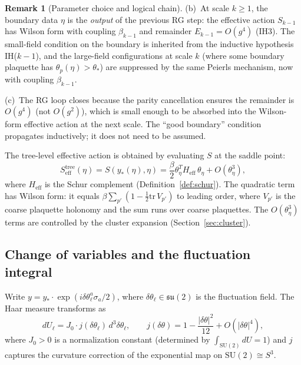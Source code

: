 \documentclass[11pt]{article}
\theoremstyle{definition}
\newtheorem{remark}[theorem]{Remark}
\newcommand{\SU}{\mathrm{SU}}
\newcommand{\su}{\mathfrak{su}}
\newcommand{\tr}{\mathrm{tr}}
\begin{document}
\begin{remark}[Parameter choice and logical chain]
(b)~At scale $k\ge 1$, the boundary data $\eta$ is the
\emph{output} of the previous RG step: the effective action
$S_{k-1}$ has Wilson form with coupling $\beta_{k-1}$
and remainder $E_{k-1}=O(g^4)$ (IH3).  The small-field
condition on the boundary is inherited from the inductive
hypothesis IH($k-1$), and the large-field configurations
at scale $k$ (where some boundary plaquette has
$\theta_p(\eta)>\theta_*$) are suppressed by the same
Peierls mechanism, now with coupling $\beta_{k-1}$.

(c)~The RG loop closes because the parity cancellation
ensures the remainder is $O(g^4)$ (not $O(g^2)$), which is
small enough to be absorbed into the Wilson-form effective
action at the next scale.  The ``good boundary'' condition
propagates inductively; it does not need to be assumed.
\end{remark}

The tree-level effective action is obtained by evaluating $S$ at the
saddle point:
\begin{equation}\label{eq:tree}
S_{\mathrm{eff}}^{\mathrm{tree}}(\eta)
=S(y_*(\eta),\eta)
=\frac{\beta}{2}\theta_\eta^T H_{\mathrm{eff}}\,\theta_\eta
+O(\theta_\eta^3),
\end{equation}
where $H_{\mathrm{eff}}$ is the Schur complement
(Definition~\ref{def:schur}).  The quadratic term has Wilson form:
it equals $\beta\sum_{p'}(1-\frac{1}{2}\tr\,V_{p'})$ to leading
order, where $V_{p'}$ is the coarse plaquette holonomy and the sum
runs over coarse plaquettes.  The $O(\theta_\eta^3)$ terms are
controlled by the cluster expansion (Section~\ref{sec:cluster}).

\subsection{Change of variables and the fluctuation integral}
\label{subsec:fluctuation}

Write $y=y_*\cdot\exp(i\delta\theta^a_\ell\sigma_a/2)$, where
$\delta\theta_\ell\in\su(2)$ is the fluctuation field.  The Haar
measure transforms as
\begin{equation}
dU_\ell=J_0\cdot j(\delta\theta_\ell)\,d^3\delta\theta_\ell,
\qquad j(\delta\theta)=1-\frac{|\delta\theta|^2}{12}+O(|\delta\theta|^4),
\end{equation}
where $J_0>0$ is a normalization constant (determined by
$\int_{\SU(2)}dU=1$) and $j$ captures the curvature correction of
the exponential map on $\SU(2)\cong S^3$.
\end{document}
